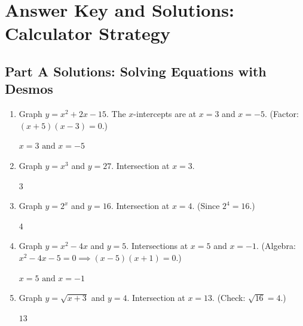 \documentclass[14pt]{extarticle}
\begin{document}
\newpage

\section*{Answer Key and Solutions: Calculator Strategy}

\subsection*{Part A Solutions: Solving Equations with Desmos}
\begin{enumerate}
  \item Graph \(y = x^2 + 2x - 15\). The \(x\)-intercepts are at \(x = 3\) and \(x = -5\). (Factor: \((x+5)(x-3) = 0\).)

  \(\boxed{x = 3 \text{ and } x = -5}\)

  \item Graph \(y = x^3\) and \(y = 27\). Intersection at \(x = 3\).

  \(\boxed{3}\)

  \item Graph \(y = 2^x\) and \(y = 16\). Intersection at \(x = 4\). (Since \(2^4 = 16\).)

  \(\boxed{4}\)

  \item Graph \(y = x^2 - 4x\) and \(y = 5\). Intersections at \(x = 5\) and \(x = -1\). (Algebra: \(x^2 - 4x - 5 = 0 \implies (x-5)(x+1) = 0\).)

  \(\boxed{x = 5 \text{ and } x = -1}\)

  \item Graph \(y = \sqrt{x + 3}\) and \(y = 4\). Intersection at \(x = 13\). (Check: \(\sqrt{16} = 4\).)

  \(\boxed{13}\)
\end{enumerate}
\end{document}
